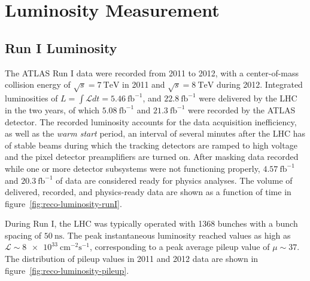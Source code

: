\chapter{Luminosity Measurement}\label{ch:luminosity}
\section{Run I Luminosity}

The ATLAS Run I data were recorded from 2011 to 2012, with a center-of-mass collision energy of $\sqrt{s}=\SI{7}{\tera\electronvolt}$ in 2011 and $\sqrt{s}=\SI{8}{\tera\electronvolt}$ during 2012. Integrated luminosities of $L=\int \mathcal{L} dt=\SI{5.46}{\femto\barn\tothe{-1}}$, and $\SI{22.8}{\femto\barn\tothe{-1}}$ were delivered by the LHC in the two years, of which $\SI{5.08}{\femto\barn\tothe{-1}}$ and $\SI{21.3}{\femto\barn\tothe{-1}}$ were recorded by the ATLAS detector. The recorded luminosity accounts for the data acquisition inefficiency, as well as the \emph{warm start} period, an interval of several minutes after the LHC has of stable beams during which the tracking detectors are ramped to high voltage and the pixel detector preamplifiers are turned on. After masking data recorded while one or more detector subsystems were not functioning properly, $\SI{4.57}{\femto\barn\tothe{-1}}$ and $\SI{20.3}{\femto\barn\tothe{-1}}$ of data are considered ready for physics analyses. The volume of delivered, recorded, and physics-ready data are shown as a function of time in figure~\ref{fig:reco-luminosity-runI}. 

During Run I, the LHC was typically operated with 1368 bunches with a bunch spacing of $\SI{50}{\nano\second}$. The peak instantaneous luminosity reached values as high as $\mathcal{L}\sim\SI[per-mode=symbol]{8e33}{\centi\meter\tothe{-2}\second\tothe{-1}}$, corresponding to a peak average pileup value of $\mu\sim37$. The distribution of pileup values in 2011 and 2012 data are shown in figure~\ref{fig:reco-luminosity-pileup}. 

